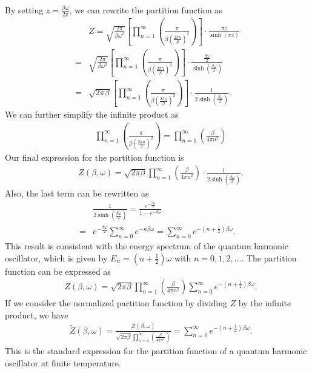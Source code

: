By setting $z = \frac{\beta \omega}{2\pi}$, we can rewrite the partition function as
\begin{align}
    &Z=\sqrt{\frac{2\pi}{\beta\omega^2}} \left[\prod_{n=1}^{\infty} \left( \frac{\pi}{\beta\left(\frac{2\pi n}{\beta}\right)^2} \right)\right] \cdot \frac{\pi z}{\sinh(\pi z)}\\
    =&\sqrt{\frac{2\pi}{\beta\omega^2}} \left[\prod_{n=1}^{\infty} \left( \frac{\pi}{\beta\left(\frac{2\pi n}{\beta}\right)^2} \right)\right] \cdot \frac{\frac{\beta \omega}{2}}{\sinh\left( \frac{\beta \omega}{2} \right)}\\
    =&\sqrt{2\pi\beta} \left[\prod_{n=1}^{\infty} \left( \frac{\pi}{\beta\left(\frac{2\pi n}{\beta}\right)^2} \right)\right] \cdot \frac{1}{2\sinh\left( \frac{\beta \omega}{2} \right)}.
\end{align}
We can further simplify the infinite product as
\begin{align}
    &\prod_{n=1}^{\infty} \left( \frac{\pi}{\beta\left(\frac{2\pi n}{\beta}\right)^2} \right) = \prod_{n=1}^{\infty} \left( \frac{\beta}{4\pi n^2} \right) 
\end{align}
Our final expression for the partition function is
\begin{align}
    &Z(\beta, \omega) = \sqrt{2\pi\beta} \prod_{n=1}^{\infty} \left( \frac{\beta}{4\pi n^2} \right) \cdot \frac{1}{2\sinh\left( \frac{\beta \omega}{2} \right)}.
\end{align}
Also, the last term can be rewritten as
\begin{align}
    &\frac{1}{2\sinh\left( \frac{\beta \omega}{2} \right)} = \frac{e^{-\frac{\beta \omega}{2}}}{1 - e^{-\beta \omega}}\\
    =& e^{-\frac{\beta \omega}{2}} \sum_{n=0}^{\infty} e^{-n \beta \omega} = \sum_{n=0}^{\infty} e^{-\left( n + \frac{1}{2} \right) \beta \omega}.
\end{align}
This result is consistent with the energy spectrum of the quantum harmonic oscillator, which is given by $E_n = \left( n + \frac{1}{2} \right) \omega$ with $n = 0, 1, 2, \ldots$. The partition function can be expressed as
\begin{align}
    &Z(\beta, \omega) = \sqrt{2\pi\beta} \prod_{n=1}^{\infty} \left( \frac{\beta}{4\pi n^2} \right) \sum_{n=0}^{\infty} e^{-\left( n + \frac{1}{2} \right) \beta \omega}.
\end{align}
If we consider the normalized partition function by dividing $Z$ by the infinite product, we have
\begin{align}
    &\tilde{Z}(\beta, \omega) = \frac{Z(\beta, \omega)}{\sqrt{2\pi\beta} \prod_{n=1}^{\infty} \left( \frac{\beta}{4\pi n^2} \right)} = \sum_{n=0}^{\infty} e^{-\left( n + \frac{1}{2} \right) \beta \omega}.
\end{align}
This is the standard expression for the partition function of a quantum harmonic oscillator at finite temperature. 


